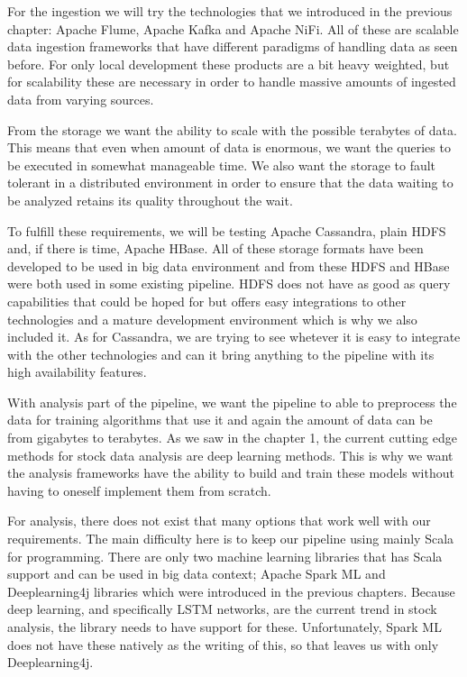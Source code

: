 For the ingestion we will try the technologies that we introduced in the previous chapter: Apache Flume, Apache Kafka and Apache NiFi.
All of these are scalable data ingestion frameworks that have different paradigms of handling data as seen before.
For only local development these products are a bit heavy weighted, but for scalability these are necessary in order to handle massive amounts of ingested data from varying sources.

From the storage we want the ability to scale with the possible terabytes of data.
This means that even when amount of data is enormous, we want the queries to be executed in somewhat manageable time.
We also want the storage to fault tolerant in a distributed environment in order to ensure that the data waiting to be analyzed retains its quality throughout the wait.

To fulfill these requirements, we will be testing Apache Cassandra, plain HDFS and, if there is time, Apache HBase.
All of these storage formats have been developed to be used in big data environment and from these HDFS and HBase were both used in some existing pipeline.
HDFS does not have as good as query capabilities that could be hoped for but offers easy integrations to other technologies and a mature development environment which is why we also included it.
As for Cassandra, we are trying to see whetever it is easy to integrate with the other technologies and can it bring anything to the pipeline with its high availability features.

With analysis part of the pipeline, we want the pipeline to able to preprocess the data for training algorithms that use it and again the amount of data can be from gigabytes to terabytes.
As we saw in the chapter 1, the current cutting edge methods for stock data analysis are deep learning methods.
This is why we want the analysis frameworks have the ability to build and train these models without having to oneself implement them from scratch.

For analysis, there does not exist that many options that work well with our requirements.
The main difficulty here is to keep our pipeline using mainly Scala for programming.
There are only two machine learning libraries that has Scala support and can be used in big data context; Apache Spark ML and Deeplearning4j libraries which were introduced in the previous chapters.
Because deep learning, and specifically LSTM networks, are the current trend in stock analysis, the library needs to have support for these.
Unfortunately, Spark ML does not have these natively as the writing of this, so that leaves us with only Deeplearning4j.

